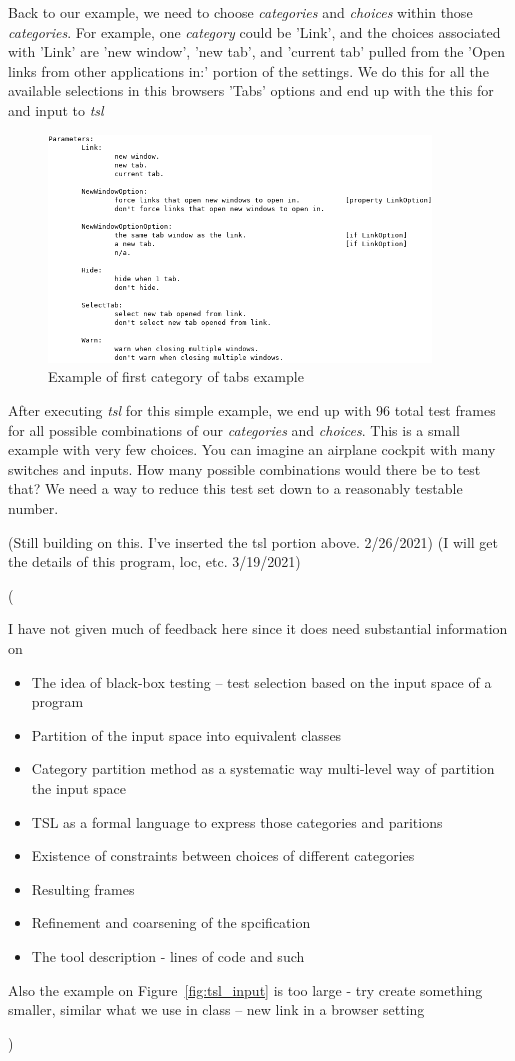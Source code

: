 \documentclass[a4full,12pt]{article}
\newcommand{\eas}[1]{{\color{blue}\sf ({#1})}}
\newcommand{\ag}[1]{{\color{red}\sf ({#1})}}
\begin{document}
Back to our example, we need to choose \emph{categories} and \emph{choices} within those
  \emph{categories}. For example, one \emph{category} could be 'Link', and the choices
  associated with 'Link' are 'new window', 'new tab', and 'current tab' pulled from the
  'Open links from other applications in:' portion of the settings. We do this for all
  the available selections in this browsers 'Tabs' options and end up with the this for
  and input to \emph{tsl}
\begin{figure}[htb]
\centering
\includegraphics[width=4in,keepaspectratio]{images/tsl_input_final.png}
\caption{Example of first category of tabs example}
\label{fig:tsl_input_final}
\end{figure}

After executing \emph{tsl} for this simple example, we end up with 96 total test frames
  for all possible combinations of our \emph{categories} and \emph{choices}. This is a
  small example with very few choices. You can imagine an airplane cockpit with many
  switches and inputs. How many possible combinations would there be to test that? We
  need a way to reduce this test set down to a reasonably testable number.
  
  
\ag{Still building on this. I've inserted the tsl portion above. 2/26/2021}
\ag{I will get the details of this program, loc, etc. 3/19/2021}
\eas{I have not given much of feedback here since it does need substantial information on
  \begin{itemize}
  \item The idea of black-box testing -- test selection based on the input space of a program
  \item Partition of the input space into equivalent classes
  \item Category partition method as a systematic way multi-level way of partition the input space
  \item TSL as a formal language to express those categories and paritions
  \item Existence of constraints between choices of different categories
  \item Resulting frames
  \item Refinement and coarsening of the spcification
  \item The tool description - lines of code and such
  \end{itemize}
  Also the example on Figure~\ref{fig:tsl_input} is too large - try create something smaller, similar what we use in class -- new link in a browser setting
}
\end{document}
